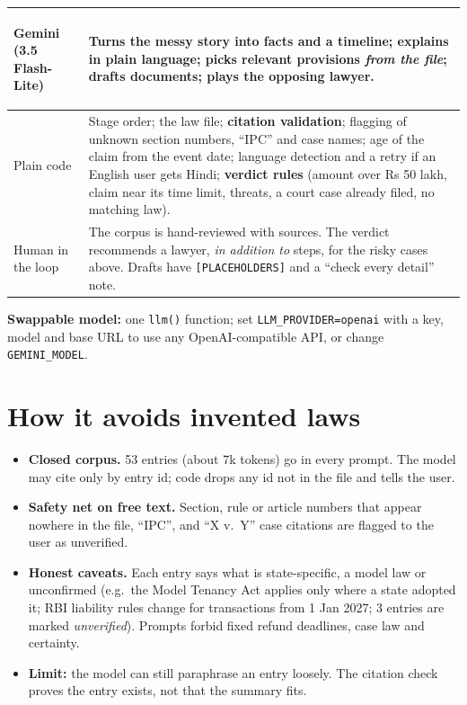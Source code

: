 \documentclass[9pt,a4paper]{extarticle}
\begin{document}
\smallskip
\begin{tabularx}{\linewidth}{|>{\bfseries\raggedright\arraybackslash}p{26mm}|Y|}
\hline
Gemini (3.5 Flash-Lite) & Turns the messy story into facts and a timeline; explains in plain language; picks relevant provisions \emph{from the file}; drafts documents; plays the opposing lawyer. \\ \hline
Plain code & Stage order; the law file; \textbf{citation validation}; flagging of unknown section numbers, ``IPC'' and case names; age of the claim from the event date; language detection and a retry if an English user gets Hindi; \textbf{verdict rules} (amount over Rs 50 lakh, claim near its time limit, threats, a court case already filed, no matching law). \\ \hline
Human in the loop & The corpus is hand-reviewed with sources. The verdict recommends a lawyer, \emph{in addition to} steps, for the risky cases above. Drafts have \texttt{[PLACEHOLDERS]} and a ``check every detail'' note. \\ \hline
\end{tabularx}

\smallskip
\textbf{Swappable model:} one \texttt{llm()} function; set \texttt{LLM\_PROVIDER=openai} with a key, model and base URL to use any OpenAI-compatible API, or change \texttt{GEMINI\_MODEL}.

\section{How it avoids invented laws}
\begin{itemize}
\item \textbf{Closed corpus.} 53 entries (about 7k tokens) go in every prompt. The model may cite only by entry id; code drops any id not in the file and tells the user.
\item \textbf{Safety net on free text.} Section, rule or article numbers that appear nowhere in the file, ``IPC'', and ``X v.\ Y'' case citations are flagged to the user as unverified.
\item \textbf{Honest caveats.} Each entry says what is state-specific, a model law or unconfirmed (e.g.\ the Model Tenancy Act applies only where a state adopted it; RBI liability rules change for transactions from 1 Jan 2027; 3 entries are marked \emph{unverified}). Prompts forbid fixed refund deadlines, case law and certainty.
\item \textbf{Limit:} the model can still paraphrase an entry loosely. The citation check proves the entry exists, not that the summary fits.
\end{itemize}
\end{document}
